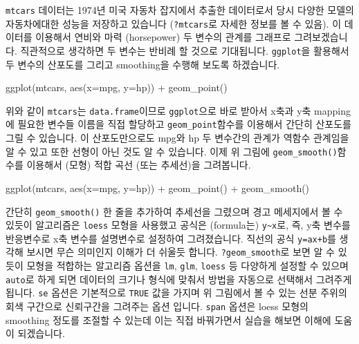 \documentclass[
]{book}
\newenvironment{Shaded}{\begin{snugshade}}{\end{snugshade}}
\newcommand{\AttributeTok}[1]{\textcolor[rgb]{0.77,0.63,0.00}{#1}}
\newcommand{\FunctionTok}[1]{\textcolor[rgb]{0.00,0.00,0.00}{#1}}
\newcommand{\NormalTok}[1]{#1}
\newcommand{\SpecialCharTok}[1]{\textcolor[rgb]{0.00,0.00,0.00}{#1}}
\begin{document}
\texttt{mtcars} 데이터는 1974년 미국 자동차 잡지에서 추출한 데이터로서 당시 다양한 모델의 자동차에대한 성능을 저장하고 있습니다 (\texttt{?mtcars}로 자세한 정보를 볼 수 있음). 이 데이터를 이용해서 연비와 마력 (horsepower) 두 변수의 관계를 그래프로 그려보겠습니다. 직관적으로 생각하면 두 변수는 반비례 할 것으로 기대됩니다. \texttt{ggplot}을 활용해서 두 변수의 산포도를 그리고 smoothing을 수행해 보도록 하겠습니다.

\begin{Shaded}
\begin{Highlighting}[]
\FunctionTok{ggplot}\NormalTok{(mtcars, }\FunctionTok{aes}\NormalTok{(}\AttributeTok{x=}\NormalTok{mpg, }\AttributeTok{y=}\NormalTok{hp)) }\SpecialCharTok{+}
  \FunctionTok{geom\_point}\NormalTok{()}
\end{Highlighting}
\end{Shaded}

위와 같이 \texttt{mtcars}는 \texttt{data.frame}이므로 \texttt{ggplot}으로 바로 받아서 x축과 y축 mapping에 필요한 변수들 이름을 직접 할당하고 \texttt{geom\_point}함수를 이용해서 간단히 산포도를 그릴 수 있습니다. 이 산포도만으로도 mpg와 hp 두 변수간의 관계가 역함수 관계임을 알 수 있고 또한 선형이 아닌 것도 알 수 있습니다. 이제 위 그림에 \texttt{geom\_smooth()}함수를 이용해서 (모형) 적합 곡선 (또는 추세선)을 그려봅니다.

\begin{Shaded}
\begin{Highlighting}[]
\FunctionTok{ggplot}\NormalTok{(mtcars, }\FunctionTok{aes}\NormalTok{(}\AttributeTok{x=}\NormalTok{mpg, }\AttributeTok{y=}\NormalTok{hp)) }\SpecialCharTok{+}
  \FunctionTok{geom\_point}\NormalTok{() }\SpecialCharTok{+}
  \FunctionTok{geom\_smooth}\NormalTok{()}
\end{Highlighting}
\end{Shaded}

간단히 \texttt{geom\_smooth()} 한 줄을 추가하여 추세선을 그렸으며 경고 메세지에서 볼 수 있듯이 알고리즘은 \texttt{loess} 모형을 사용했고 공식은 (formula는) \texttt{y\textasciitilde{}x}로, 즉, y축 변수를 반응변수로 x축 변수를 설명변수로 설정하여 그려졌습니다. 직선의 공식 \texttt{y=ax+b}를 생각해 보시면 무슨 의미인지 이해가 더 쉬울듯 합니다. \texttt{?geom\_smooth}로 보면 알 수 있듯이 모형을 적합하는 알고리즘 옵션을 \texttt{lm}, \texttt{glm}, \texttt{loess} 등 다양하게 설정할 수 있으며 \texttt{auto}로 하게 되면 데이터의 크기나 형식에 맞춰서 방법을 자동으로 선택해서 그려주게 됩니다. \texttt{se} 옵션은 기본적으로 \texttt{TRUE} 값을 가지며 위 그림에서 볼 수 있는 선분 주위의 회색 구간으로 신뢰구간을 그려주는 옵션 입니다. \texttt{span} 옵션은 loess 모형의 smoothing 정도를 조절할 수 있는데 이는 직접 바꿔가면서 실습을 해보면 이해에 도움이 되겠습니다.
\end{document}
